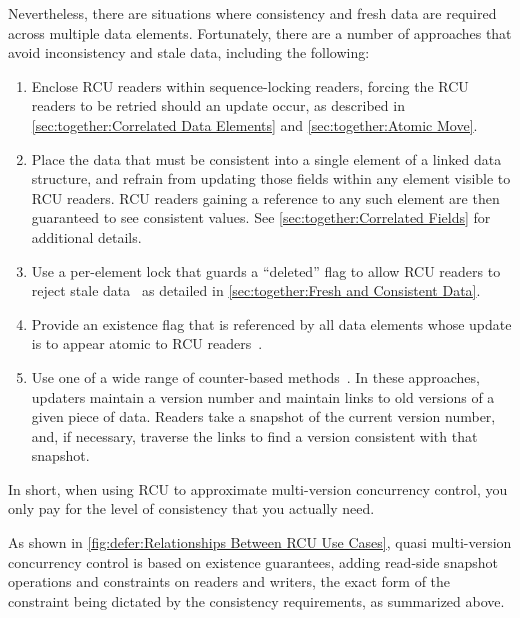 Nevertheless, there are situations where consistency and fresh data are
required across multiple data elements.
Fortunately, there are a number of approaches that avoid inconsistency
and stale data, including the following:

\begin{enumerate}
\item	Enclose RCU readers within sequence-locking readers, forcing
	the RCU readers to be retried should an update occur,
	as described in
	\cref{sec:together:Correlated Data Elements}
	and
	\cref{sec:together:Atomic Move}.
\item	Place the data that must be consistent into a single element
	of a linked data structure, and refrain from updating those
	fields within any element visible to RCU readers.
	RCU readers gaining a reference to any such element are then
	guaranteed to see consistent values.
	See \cref{sec:together:Correlated Fields} for additional details.
\item	Use a per-element lock that guards a ``deleted'' flag to allow
	RCU readers to reject stale
	data~\cite{PaulEdwardMcKenneyPhD,Arcangeli03}
	as detailed in
	\cref{sec:together:Fresh and Consistent Data}.
\item	Provide an existence flag that is referenced by all data elements
	whose update is to appear atomic to RCU
	readers~\cite{PaulEMcKennneyAtomicTreeN4037,PaulEMcKennneyAtomicTreeCPPCON2014,PaulEMcKenneyIssaquahUpdate2015,PaulEMcKenney2016IssaquahACMApp,PaulEMcKenney2016IssaquahCPPCON}.
\item	Use one of a wide range of counter-based
	methods~\cite{PaulEMcKenney2008cyclicRCU,PaulEMcKenney2010cyclicRCU,PaulEMcKenney2011cyclicparallelRCU,PaulEMcKenney2014cyclicRCU,Matveev:2015:RLS:2815400.2815406,Kim:2019:MSR:3297858.3304040}.
	In these approaches, updaters maintain a version number and maintain links
	to old versions of a given piece of data.
	Readers take a snapshot of the current version number, and, if necessary,
	traverse the links to find a version consistent with that snapshot.
\end{enumerate}

In short, when using RCU to approximate multi-version concurrency control,
you only pay for the level of consistency that you actually need.

As shown in \cref{fig:defer:Relationships Between RCU Use Cases},
quasi multi-version concurrency control is based on existence guarantees,
adding read-side snapshot operations and constraints on readers and
writers, the exact form of the constraint being dictated by the
consistency requirements, as summarized above.

